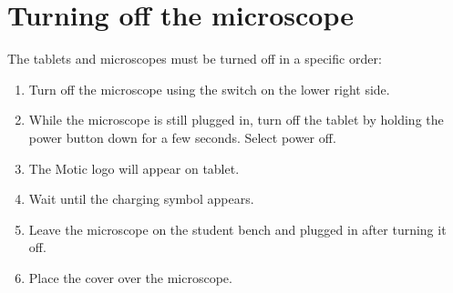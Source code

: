 \documentclass[]{book}
\providecommand{\tightlist}{%
  \setlength{\itemsep}{0pt}\setlength{\parskip}{0pt}}
\theoremstyle{definition}
\theoremstyle{definition}
\theoremstyle{definition}
\theoremstyle{remark}
\begin{document}
\section{Turning off the microscope}\label{turning-off-the-microscope}

The tablets and microscopes must be turned off in a specific order:

\begin{enumerate}
\def\labelenumi{\arabic{enumi}.}
\tightlist
\item
  Turn off the microscope using the switch on the lower right side.
\item
  While the microscope is still plugged in, turn off the tablet by
  holding the power button down for a few seconds. Select power off.
\item
  The Motic logo will appear on tablet.
\item
  Wait until the charging symbol appears.
\item
  Leave the microscope on the student bench and plugged in after turning
  it off.
\item
  Place the cover over the microscope.
\end{enumerate}
\end{document}
